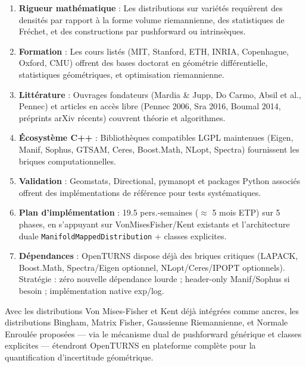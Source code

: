 \documentclass[11pt,a4paper]{article}
\begin{document}
\begin{enumerate}
    \item \textbf{Rigueur mathématique} : Les distributions sur variétés requièrent des densités par rapport à la forme volume riemannienne, des statistiques de Fréchet, et des constructions par pushforward ou intrinsèques.
    \item \textbf{Formation} : Les cours listés (MIT, Stanford, ETH, INRIA, Copenhague, Oxford, CMU) offrent des bases doctorat en géométrie différentielle, statistiques géométriques, et optimisation riemannienne.
    \item \textbf{Littérature} : Ouvrages fondateurs (Mardia \& Jupp, Do Carmo, Absil et al., Pennec) et articles en accès libre (Pennec 2006, Sra 2016, Boumal 2014, préprints arXiv récents) couvrent théorie et algorithmes.
    \item \textbf{Écosystème C++} : Bibliothèques compatibles LGPL maintenues (Eigen, Manif, Sophus, GTSAM, Ceres, Boost.Math, NLopt, Spectra) fournissent les briques computationnelles.
    \item \textbf{Validation} : Geomstats, Directional, pymanopt et packages Python associés offrent des implémentations de référence pour tests systématiques.
    \item \textbf{Plan d'implémentation} : 19.5 pers.-semaines ($\approx$ 5 mois ETP) sur 5 phases, en s'appuyant sur VonMisesFisher/Kent existants et l'architecture duale \texttt{ManifoldMappedDistribution} + classes explicites.
    \item \textbf{Dépendances} : OpenTURNS dispose déjà des briques critiques (LAPACK, Boost.Math, Spectra/Eigen optionnel, NLopt/Ceres/IPOPT optionnels). Stratégie : zéro nouvelle dépendance lourde ; header-only Manif/Sophus si besoin ; implémentation native exp/log.
\end{enumerate}

Avec les distributions Von Mises-Fisher et Kent déjà intégrées comme ancres, les distributions Bingham, Matrix Fisher, Gaussienne Riemannienne, et Normale Enroulée proposées --- via le mécanisme dual de pushforward générique et classes explicites --- étendront OpenTURNS en plateforme complète pour la quantification d'incertitude géométrique.
\end{document}
